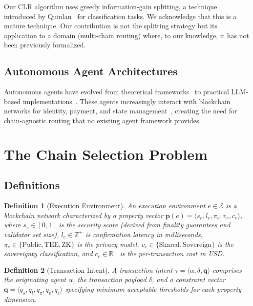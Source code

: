 \documentclass[conference, 10pt, twocolumn]{IEEEtran}
\newtheorem{definition}{Definition}
\begin{document}
Our CLR algorithm uses greedy information-gain splitting, a technique
introduced by Quinlan~\cite{quinlan1986induction} for classification
tasks.  We acknowledge that this is a mature technique.  Our
contribution is not the splitting strategy but its application to a
domain (multi-chain routing) where, to our knowledge, it has not been
previously formalized.

\subsection{Autonomous Agent Architectures}

Autonomous agents have evolved from theoretical
frameworks~\cite{wooldridge1995intelligent} to practical LLM-based
implementations~\cite{yao2023react, park2023generative}.  These agents
increasingly interact with blockchain networks for identity, payment,
and state management~\cite{chishti2026vams}, creating the need for
chain-agnostic routing that no existing agent framework provides.

\section{The Chain Selection Problem}
\label{sec:model}

\subsection{Definitions}

\begin{definition}[Execution Environment]
An \emph{execution environment} $e \in \mathcal{E}$ is a blockchain
network characterized by a property vector
$\mathbf{p}(e) = \langle s_e, l_e, \pi_e, v_e, c_e \rangle$, where
$s_e \in [0,1]$ is the security score (derived from finality
guarantees and validator set size), $l_e \in \mathbb{Z}^+$ is
confirmation latency in milliseconds, $\pi_e \in \{\text{Public},
\text{TEE}, \text{ZK}\}$ is the privacy model, $v_e \in
\{\text{Shared}, \text{Sovereign}\}$ is the sovereignty
classification, and $c_e \in \mathbb{R}^+$ is the per-transaction
cost in USD.
\end{definition}

\begin{definition}[Transaction Intent]
A \emph{transaction intent} $\tau = \langle \alpha, \delta,
\mathbf{q} \rangle$ comprises the originating agent $\alpha$, the
transaction payload $\delta$, and a \emph{constraint vector}
$\mathbf{q} = \langle q_s, q_l, q_\pi, q_v, q_c \rangle$ specifying
minimum acceptable thresholds for each property dimension.
\end{definition}
\end{document}
